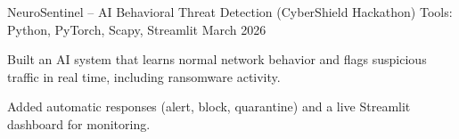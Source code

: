 \resumeProject
    {NeuroSentinel -- AI Behavioral Threat Detection (CyberShield Hackathon)}
    {Tools: Python, PyTorch, Scapy, Streamlit}
    {March 2026}
    {{} }
    \resumeItemListStart
      \item Built an AI system that learns normal network behavior and flags suspicious traffic in real time, including ransomware activity.
      \item Added automatic responses (alert, block, quarantine) and a live Streamlit dashboard for monitoring.
    \resumeItemListEnd